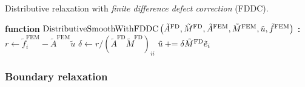 \begin{algorithm}[htbp]
\caption{Distributive relaxation with \emph{finite difference defect correction} (FDDC).}
\label{alg:chap5.distributive.defectcorrection}
\begin{algorithmic}[1]
\STATE \textbf{function} $\operatorname{DistributiveSmoothWithFDDC} \left( \tilde{A}^{\text{FD}}, \tilde{M}^{\text{FD}}, \tilde{A}^{\text{FEM}}, \tilde{M}^{\text{FEM}}, \tilde{u}, \tilde{f}^{\text{FEM}} \right)$ \textbf{:}
        \STATE $r \leftarrow \tilde{f}^{\text{FEM}}_i - \tilde{A}^{\text{FEM}} \tilde{u}$
        \STATE $\delta \leftarrow r / (\tilde{A}^{\text{FD}} \tilde{M}^{\text{FD}})_{ii}$
        \STATE $\tilde{u} +{}\!\!\!= \delta \tilde{M}^{\text{FD}} \tilde{e}_i$
    \ENDFOR
\ENDFOR
\end{algorithmic}
\end{algorithm}

\subsubsection{Boundary relaxation}

